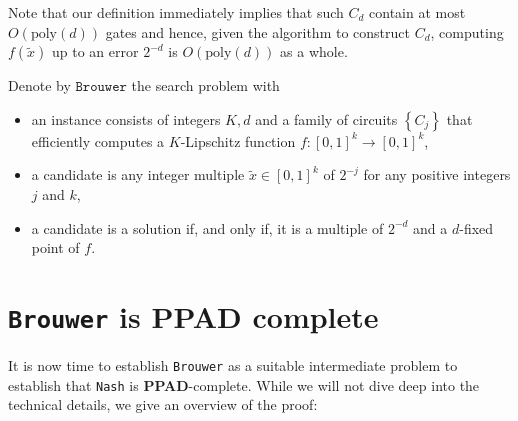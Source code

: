 \documentclass{article}
\begin{document}
Note that our definition immediately implies that such $C_d$ contain
at most $O(\text{poly}(d))$ gates and hence, given the algorithm to
construct $C_d$, computing $f(\tilde x)$ up to an error $2^{-d}$ is
$O(\text{poly}(d))$ as a whole.

\begin{definition}
  Denote by $\texttt{Brouwer}$ the search problem with
  \begin{itemize}
    \item an instance consists of integers $K,d$ and a family of
      circuits $\left\lbrace{C_j}\right\rbrace$ that
      efficiently computes a $K$-Lipschitz function $f:\left[{0,1}\right]^k\to\left[{0,1}\right]^k$,
    \item a candidate is any integer multiple $\tilde x\in\left[{0,1}\right]^k$ of $2^{-j}$ for any positive integers $j$ and $k$,
    \item a candidate is a solution if, and only if, it is a
      multiple of $2^{-d}$ and a $d$-fixed point of $f$.
  \end{itemize}
\end{definition}

\section{\texttt{Brouwer} is PPAD complete}

It is now time to establish \texttt{Brouwer} as a suitable intermediate
problem to establish that \texttt{Nash} is \textbf{PPAD}-complete.
While we will not dive deep into the technical details, we give an overview
of the proof:
\end{document}
